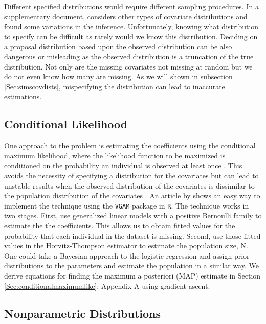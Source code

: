 \documentclass[
  12pt,
]{article}
\begin{document}
Different specified distributions would require different sampling
procedures. In a supplementary document, \cite{royle_analysis_2009}
considers other types of covariate distributions and found some
variations in the inference. Unfortunately, knowing what distribution to
specify can be difficult as rarely would we know this distribution.
Deciding on a proposal distribution based upon the observed distribution
can be also dangerous or misleading as the observed distribution is a
truncation of the true distribution. Not only are the missing covariates
not missing at random but we do not even know how many are missing. As
we will shown in subsection \ref{Sec:simscovdists}, mispecifying the
distribution can lead to inaccurate estimations.

\subsection{Conditional Likelihood}

One approach to the problem is estimating the coefficients using the
conditional maximum likelihood, where the likelihood function to be
maximized is conditioned on the probability an individual is observed at
least once \citep{alho_logistic_1990,huggins_statistical_1989}. This
avoids the necessity of specifying a distribution for the covariates but
can lead to unstable results when the observed distribution of the
covariates is dissimilar to the population distribution of the
covariates \citep{tilling_capture-recapture_1999}. An article by
\cite{yee_vgam_2015} shows an easy way to implement the technique using
the \texttt{VGAM} package in \texttt{R}. The technique works in two
stages. First, use generalized linear models with a positive Bernoulli
family to estimate the the coefficients. This allows us to obtain fitted
values for the probability that each individual in the dataset is
missing. Second, use those fitted values in the Horvitz-Thompson
estimator \citep{horvitz_generalization_1952} to estimate the population
size, N. One could take a Bayesian approach to the logistic regression
and assign prior distributions to the parameters and estimate the
population in a similar way. We derive equations for finding the maximum
a posteriori (MAP) estimate in Section \ref{Sec:conditionalmaximumlike}:
Appendix A using gradient ascent.

\subsection{Nonparametric Distributions}
\end{document}
